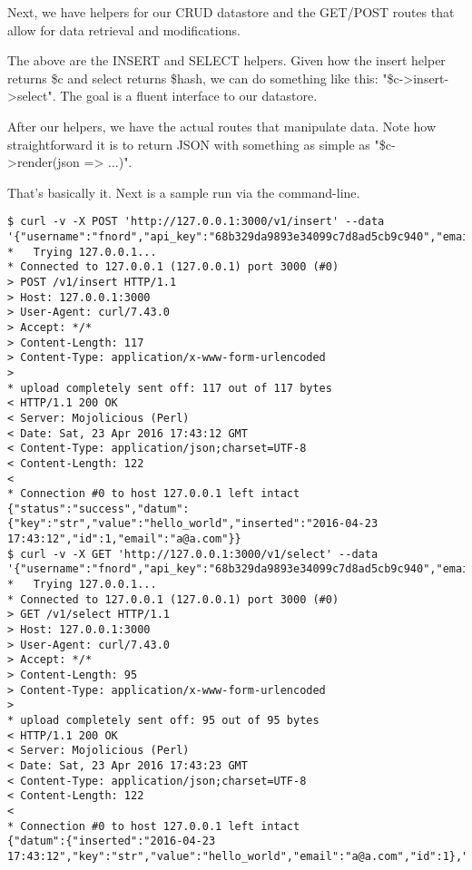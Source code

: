 \documentclass[14pt]{extreport}
\begin{document}


Next, we have helpers for our CRUD datastore and the GET/POST routes that allow
for data retrieval and modifications.

\clearpage



The above are the INSERT and SELECT helpers.  Given how the insert helper returns \$c and
select returns \$hash, we can do something like this: "\$c->insert->select".  The goal
is a fluent interface to our datastore.

After our helpers, we have the actual routes that manipulate data.  Note how straightforward
it is to return JSON with something as simple as "\$c->render(json => ...)".

\clearpage



That's basically it.  Next is a sample run via the command-line.

\clearpage

\begin{lstlisting}[style=BashOutputStyle]
$ curl -v -X POST 'http://127.0.0.1:3000/v1/insert' --data '{"username":"fnord","api_key":"68b329da9893e34099c7d8ad5cb9c940","email":"a@a.com","key":"str","value":"hello_world"}'
*   Trying 127.0.0.1...
* Connected to 127.0.0.1 (127.0.0.1) port 3000 (#0)
> POST /v1/insert HTTP/1.1
> Host: 127.0.0.1:3000
> User-Agent: curl/7.43.0
> Accept: */*
> Content-Length: 117
> Content-Type: application/x-www-form-urlencoded
> 
* upload completely sent off: 117 out of 117 bytes
< HTTP/1.1 200 OK
< Server: Mojolicious (Perl)
< Date: Sat, 23 Apr 2016 17:43:12 GMT
< Content-Type: application/json;charset=UTF-8
< Content-Length: 122
< 
* Connection #0 to host 127.0.0.1 left intact
{"status":"success","datum":{"key":"str","value":"hello_world","inserted":"2016-04-23 17:43:12","id":1,"email":"a@a.com"}}
$ curl -v -X GET 'http://127.0.0.1:3000/v1/select' --data '{"username":"fnord","api_key":"68b329da9893e34099c7d8ad5cb9c940","email":"a@a.com","key":"str"}'
*   Trying 127.0.0.1...
* Connected to 127.0.0.1 (127.0.0.1) port 3000 (#0)
> GET /v1/select HTTP/1.1
> Host: 127.0.0.1:3000
> User-Agent: curl/7.43.0
> Accept: */*
> Content-Length: 95
> Content-Type: application/x-www-form-urlencoded
> 
* upload completely sent off: 95 out of 95 bytes
< HTTP/1.1 200 OK
< Server: Mojolicious (Perl)
< Date: Sat, 23 Apr 2016 17:43:23 GMT
< Content-Type: application/json;charset=UTF-8
< Content-Length: 122
< 
* Connection #0 to host 127.0.0.1 left intact
{"datum":{"inserted":"2016-04-23 17:43:12","key":"str","value":"hello_world","email":"a@a.com","id":1},"status":"success"}
\end{lstlisting}
\end{document}
